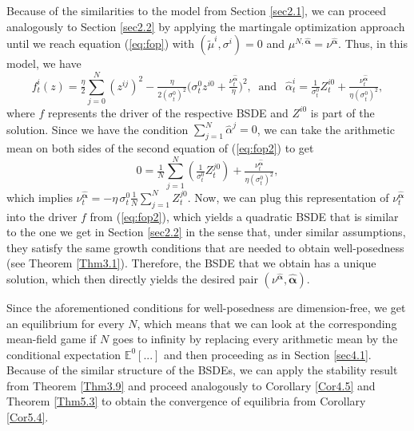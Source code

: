 \documentclass[10pt,a4paper]{article}
\newcommand{\be}{\begin{equation}}
\newcommand{\ee}{\end{equation}}
\newcommand{\Balpha}{\boldsymbol{\alpha}}
\newcommand{\hBalpha}{\hat{\Balpha}}
\newcommand{\halpha}{{\hat{\alpha}}}
\theoremstyle{plain}
\theoremstyle{definition}
\numberwithin{equation}{section}
\begin{document}
Because of the similarities to the model from Section \ref{sec2.1}, we can proceed analogously to Section \ref{sec2.2} by applying the martingale optimization approach until we reach equation (\ref{eq:fop}) with $(\tilde{\mu}^i,\sigma^i)=0$ and $\mu^{N,\hBalpha}= \nu^{\hBalpha}.$ Thus, in this model, we have 
\be\label{eq:fop2}
f_{t}^{i}(z) = \tfrac{\eta}{2}\sum_{j=0}^{N}(z^{ij})^{2} - \tfrac{\eta}{2( {\sigma}_{t}^{0})^{2}}\bigl(  \sigma_{t}^{0}z^{i0} + \tfrac{\nu_{t}^{ \hBalpha} }{\eta}\bigr)^{2}, 
 \  \text{ and } \ \ 
 \hat{\alpha}_{t}^{i} =  \tfrac{1}{ {\sigma}_{t}^{0} }Z_{t}^{i0} + \tfrac{\nu_{t}^{ \hBalpha} }{\eta( {\sigma}_{t}^{0})^{2}},
\ee
where $f$ represents the driver of the respective BSDE and $Z^{i0}$ is part of the solution. Since we have the condition $\sum_{j=1}^{N}\hat{\alpha}^{j} = 0$, we can take the arithmetic mean on both sides of the second equation of (\ref{eq:fop2}) to get
\[
0 = \tfrac{1}{N}\sum_{j=1}^{N} (\tfrac{1}{ {\sigma}_{t}^{0} }Z_{t}^{j0} ) + \tfrac{\nu_{t}^{ \hBalpha} }{\eta( {\sigma}_{t}^{0})^{2}},
\]
which implies
$
\nu_{t}^{\hat{\Balpha}} = -\eta \, \sigma^0_t \tfrac{1}{N}\sum_{j=1}^{N}  Z_{t}^{j0} .
$
Now, we can plug this representation of $\nu_{t}^{ \hat{\Balpha}}$ into the driver $f$ from (\ref{eq:fop2}), which yields a quadratic BSDE that is similar to the one we get in Section \ref{sec2.2} in the sense that, under similar assumptions, they satisfy the same growth conditions that are needed to obtain well-posedness (see Theorem \ref{Thm3.1}). Therefore, the BSDE that we obtain has a unique solution, which then directly yields the desired pair $(\nu^{\hat{\Balpha}},\hat{\Balpha})$.

Since the aforementioned conditions for well-posedness are dimension-free, we get an equilibrium for every $N$, which means that we can look at the corresponding mean-field game if $N$ goes to infinity by replacing every arithmetic mean by the conditional expectation $\mathbb{E}^{0}[...]$ and then proceeding as in Section \ref{sec4.1}. Because of the similar structure of the BSDEs, we can apply the stability result from Theorem \ref{Thm3.9} and proceed analogously to Corollary \ref{Cor4.5} and Theorem \ref{Thm5.3} to obtain the convergence of equilibria from Corollary \ref{Cor5.4}.
\end{document}
